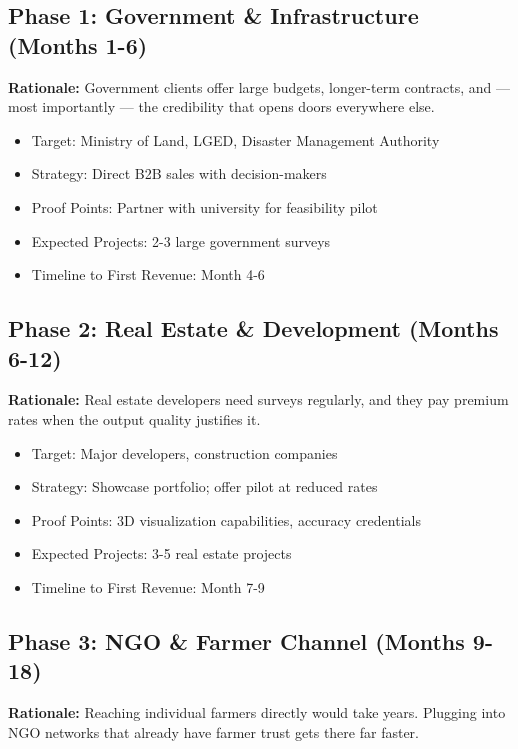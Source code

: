 \subsection{Phase 1: Government \& Infrastructure (Months 1-6)}

\textbf{Rationale:} Government clients offer large budgets, longer-term contracts, and --- most importantly --- the credibility that opens doors everywhere else.

\begin{itemize}
    \item Target: Ministry of Land, LGED, Disaster Management Authority
    \item Strategy: Direct B2B sales with decision-makers
    \item Proof Points: Partner with university for feasibility pilot
    \item Expected Projects: 2-3 large government surveys
    \item Timeline to First Revenue: Month 4-6
\end{itemize}

\subsection{Phase 2: Real Estate \& Development (Months 6-12)}

\textbf{Rationale:} Real estate developers need surveys regularly, and they pay premium rates when the output quality justifies it.

\begin{itemize}
    \item Target: Major developers, construction companies
    \item Strategy: Showcase portfolio; offer pilot at reduced rates
    \item Proof Points: 3D visualization capabilities, accuracy credentials
    \item Expected Projects: 3-5 real estate projects
    \item Timeline to First Revenue: Month 7-9
\end{itemize}

\subsection{Phase 3: NGO \& Farmer Channel (Months 9-18)}

\textbf{Rationale:} Reaching individual farmers directly would take years. Plugging into NGO networks that already have farmer trust gets there far faster.

